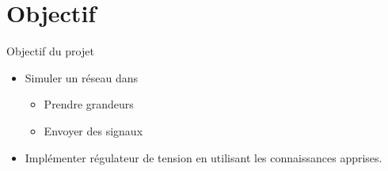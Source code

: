 \section{Objectif}
\begin{frame}{Objectif du projet}
\begin{itemize}
	\item Simuler un réseau dans \powerfactory \pause
	\begin{itemize}
		\item Prendre grandeurs\pause
		\item Envoyer des signaux\pause
	\end{itemize}
	\item Implémenter régulateur de tension en utilisant les connaissances apprises.
\end{itemize}
\end{frame}

